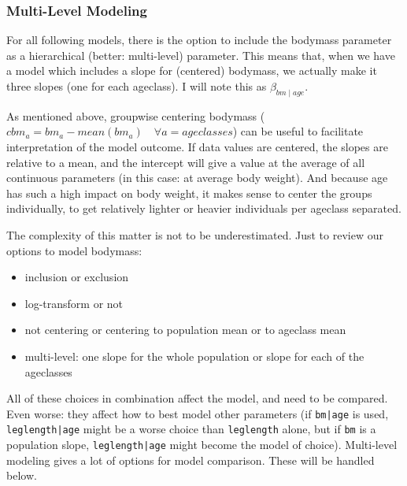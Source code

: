\FloatBarrier
\subsubsection{Multi-Level Modeling}
\label{sec:org25b6e1a}
For all following models, there is the option to include the bodymass parameter as a hierarchical (better: multi-level) parameter.
This means that, when we have a model which includes a slope for (centered) bodymass, we actually make it three slopes (one for each ageclass). I will note this as \(\beta_{bm\mid age}\).

As mentioned above, groupwise centering bodymass (\(cbm_a = bm_a - mean(bm_a)\quad \forall a = {ageclasses}\)) can be useful to facilitate interpretation of the model outcome.
If data values are centered, the slopes are relative to a mean, and the intercept will give a value at the average of all continuous parameters (in this case: at average body weight).
And because age has such a high impact on body weight, it makes sense to center the groups individually, to get relatively lighter or heavier individuals per ageclass separated.

The complexity of this matter is not to be underestimated.
Just to review our options to model bodymass:
\begin{itemize}
\item inclusion or exclusion
\item log-transform or not
\item not centering or centering to population mean or to ageclass mean
\item multi-level: one slope for the whole population or slope for each of the ageclasses
\end{itemize}

All of these choices in combination affect the model, and need to be compared.
Even worse: they affect how to best model other parameters (if \texttt{bm|age} is used, \texttt{leglength|age} might be a worse choice than \texttt{leglength} alone, but if \texttt{bm} is a population slope, \texttt{leglength|age} might become the model of choice).
Multi-level modeling gives a lot of options for model comparison.
These will be handled below.


